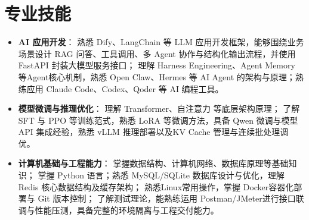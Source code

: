 \documentclass[10pt]{article}
\begin{document}
    \ResumeContactBar
    \ResumeProfileAndEducation


    \section[专业技能]{\makebox[\iconwidth][c]{\color{primarycolor}{\faWrench}}\quad 专业技能}
    \begin{itemize}
        \item \textbf{AI 应用开发}：
        熟悉 Dify、LangChain 等 LLM 应用开发框架，能够围绕业务场景设计 RAG 问答、工具调用、多 Agent 协作与结构化输出流程，并使用 FastAPI 封装大模型服务接口；
        理解 Harness Engineering、Agent Memory 等Agent核心机制，熟悉 Open Claw、Hermes 等 AI Agent 的架构与原理；熟练应用 Claude Code、Codex、Qoder 等 AI 编程工具。
        \item \textbf{模型微调与推理优化}：
        理解 Transformer、自注意力 等底层架构原理；
        了解 SFT 与 PPO 等训练范式，熟悉 LoRA 等微调方法，具备 Qwen 微调与模型 API 集成经验，熟悉 vLLM 推理部署以及KV Cache 管理与连续批处理调优。
        \item \textbf{计算机基础与工程能力}：
        掌握数据结构、计算机网络、数据库原理等基础知识；
        掌握 Python 语言；熟悉 MySQL/SQLite 数据库设计与优化，理解 Redis 核心数据结构及缓存架构；
        熟悉Linux常用操作，掌握 Docker容器化部署与 Git 版本控制；
        了解测试理论，能熟练运用 Postman/JMeter进行接口联调与性能压测，具备完整的环境隔离与工程交付能力。
    \end{itemize}

\end{document}
